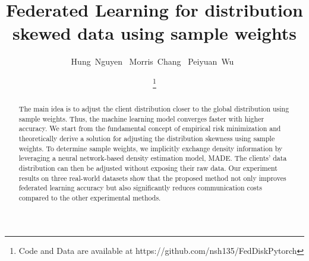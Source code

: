 \documentclass[journal]{IEEEtai}
\newcommand{\MethodnameLong}{Federated Learning for distribution skewed data using sample weights}
\begin{document}
\title{\MethodnameLong}


\author{Hung~Nguyen~
    Morris~Chang~
    Peiyuan~Wu~
}




\author{
		
	
	\thanks{Code and Data are available at https://github.com/nsh135/FedDiskPytorch}
	}

\maketitle
	
\linenumbers
\begin{abstract}
 The main idea is to adjust the client distribution closer to the global distribution using sample weights. Thus, the machine learning model converges faster with higher accuracy. We start from the fundamental concept of empirical risk minimization and theoretically derive a solution for adjusting the distribution skewness using sample weights. To determine sample weights, we implicitly exchange density information by leveraging a neural network-based density estimation model, MADE. The clients' data distribution can then be adjusted without exposing their raw data. Our experiment results on three real-world datasets show that the proposed method not only improves federated learning accuracy but also significantly reduces communication costs compared to the other experimental methods.
   
\end{abstract}
\end{document}
